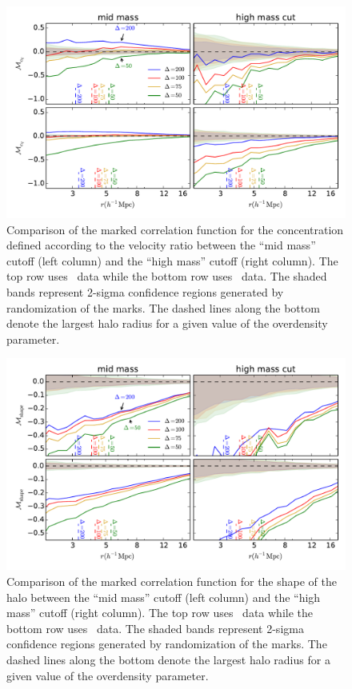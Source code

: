 \documentclass[usenatbib,usegraphicx,letterpaper]{mn2e}
\begin{document}
\begin{figure}
	\centering
	\includegraphics[width=.9\textwidth]{all_mcf_cV_z00_hostsvhigh.pdf}
	\caption{Comparison of the marked correlation function for the concentration defined according to the velocity ratio between the ``mid mass'' cutoff (left column) and the ``high mass'' cutoff (right column). The top row uses \simB \ data while the bottom row uses \simC \ data. The shaded bands represent 2-sigma confidence regions generated by randomization of the marks. The dashed lines along the bottom denote the largest halo radius for a given value of the overdensity parameter.}
	\label{fig:hvh_mcf_cV}
\end{figure}

\begin{figure}
	\centering
	\includegraphics[width=.9\textwidth]{all_mcf_s_z00_hostsvhigh.pdf}
	\caption{Comparison of the marked correlation function for the shape of the halo between the ``mid mass'' cutoff (left column) and the ``high mass'' cutoff (right column). The top row uses \simB \ data while the bottom row uses \simC \ data. The shaded bands represent 2-sigma confidence regions generated by randomization of the marks. The dashed lines along the bottom denote the largest halo radius for a given value of the overdensity parameter.}
	\label{fig:hvh_mcf_s}
\end{figure}
\end{document}
